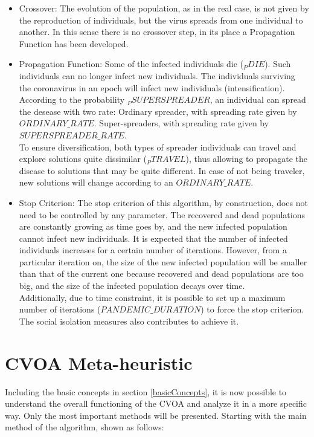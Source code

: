 \documentclass[letterpaper]{article}%
\begin{document}
\begin{itemize}
\item Crossover: The evolution of the population, as in the real case, is not given by the reproduction of individuals, but the virus spreads from one individual to another. In this sense there is no crossover step, in its place a Propagation Function has been developed.
\item Propagation Function:
Some of the infected individuals die ($_PDIE$). Such individuals can no longer infect new individuals.
The individuals surviving the coronavirus in an epoch will infect new individuals (intensification). According to the probability $_PSUPERSPREADER$, an individual can spread the desease with two rate:
\subitem Ordinary spreader, with spreading rate given by $ORDINARY\_RATE$.
\subitem Super-spreaders, with spreading rate given by $SUPERSPREADER\_RATE$.\\
To ensure diversification, both types of spreader individuals can travel and explore solutions quite dissimilar ($_PTRAVEL$), thus allowing to propagate the disease to solutions that may be quite different. In case of not being traveler, new solutions will change according to an $ORDINARY\_RATE$.
\item Stop Criterion:
The stop criterion of this algorithm, by construction, does not need to be controlled by any parameter. The recovered and dead populations are constantly growing as time goes by, and the new infected population cannot infect new individuals. It is expected that the number of infected individuals increases for a certain number of iterations. However, from a particular iteration on, the size of the new infected population will be smaller than that of the current one because recovered and dead populations are too big, and the size of the infected population decays over time. \\
Additionally, due to time constraint, it is possible to set up a maximum number of iterations ($PANDEMIC\_DURATION$) to force the stop criterion. The social isolation measures also contributes to achieve it.
\end{itemize}

\section{CVOA Meta-heuristic}
Including the basic concepts in section \ref{basicConcepts}, it is now possible to understand the overall functioning of the CVOA and analyze it in a more specific way.
Only the most important methods will be presented. Starting with the main method of the algorithm, shown as follows:
\end{document}
